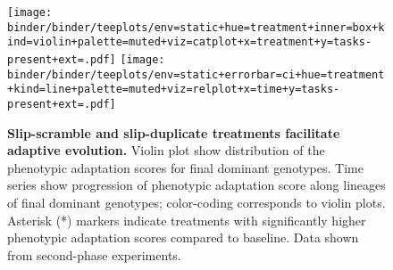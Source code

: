 \begin{figure}[!h]
  \texttt{[image: binder/binder/teeplots/env=static+hue=treatment+inner=box+kind=violin+palette=muted+viz=catplot+x=treatment+y=tasks-present+ext=.pdf]}%
   \texttt{[image: binder/binder/teeplots/env=static+errorbar=ci+hue=treatment+kind=line+palette=muted+viz=relplot+x=time+y=tasks-present+ext=.pdf]}

   \vspace{-2ex}

  \caption{\textbf{Slip-scramble and slip-duplicate treatments facilitate adaptive evolution.}
  \small Violin plot show distribution of the phenotypic adaptation scores for final dominant genotypes.
  Time series show progression of phenotypic adaptation score along lineages of final dominant genotypes;
  color-coding corresponds to violin plots.
  Asterisk (*) markers indicate treatments with significantly higher phenotypic adaptation scores compared to baseline.
  Data shown from second-phase experiments.
}
  \label{fig:results_panels}
\end{figure}
